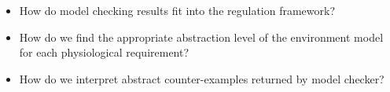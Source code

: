 \begin{itemize}	
\vspace{-5pt}
	\item How do model checking results fit into the regulation framework?
	\vspace{-5pt}
	\item How do we find the appropriate abstraction level of the environment model for each physiological requirement?
        \vspace{-5pt}
        \item How do we interpret abstract counter-examples returned by model checker?
\end{itemize}
%
%
